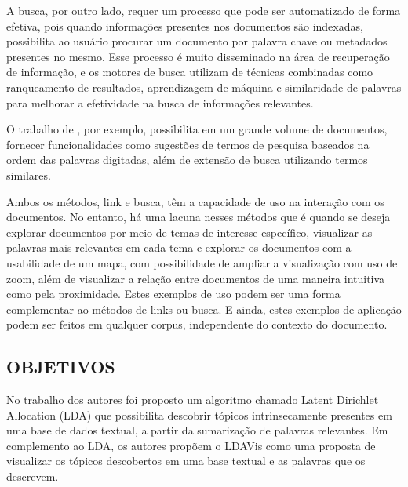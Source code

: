 \documentclass[12pt,a4paper]{article}
\begin{document}
 A busca, por outro lado,
 requer um processo que pode ser automatizado de forma efetiva, pois quando informações presentes nos documentos são indexadas, possibilita ao usuário procurar um documento por palavra chave ou metadados presentes no mesmo.
 Esse processo é muito disseminado na área de recuperação de informação, e os motores de busca utilizam de técnicas combinadas como ranqueamento de resultados, aprendizagem de máquina e similaridade de palavras para melhorar a efetividade na busca de informações relevantes.

 O trabalho de , por exemplo, possibilita em um grande volume de documentos, fornecer funcionalidades como sugestões de termos de pesquisa baseados na ordem das palavras digitadas, além de extensão de busca utilizando termos similares.

Ambos os métodos, link e busca, têm a capacidade de uso na interação com os documentos. No entanto, há uma lacuna nesses métodos que é quando se deseja explorar documentos por meio de temas de interesse específico,
 visualizar as palavras mais relevantes em cada tema e explorar os documentos com a usabilidade de um mapa, com possibilidade de ampliar a visualização com uso de zoom, além de visualizar a relação entre documentos de uma maneira intuitiva como pela proximidade. Estes exemplos de uso podem ser uma forma complementar ao métodos de links ou busca. E ainda, estes exemplos de aplicação podem ser feitos em qualquer corpus, independente do contexto do documento.
 

\subsection{OBJETIVOS} \label{sec:objetivo}

No trabalho dos autores  foi proposto um algoritmo chamado Latent Dirichlet Allocation (LDA) \cite{blei2003latent} que possibilita descobrir tópicos intrinsecamente presentes em uma base de dados textual, a partir da sumarização de palavras relevantes. Em complemento ao LDA, os autores   propõem o LDAVis como uma proposta de visualizar os tópicos descobertos em uma base textual e as palavras que os descrevem. 
\end{document}
